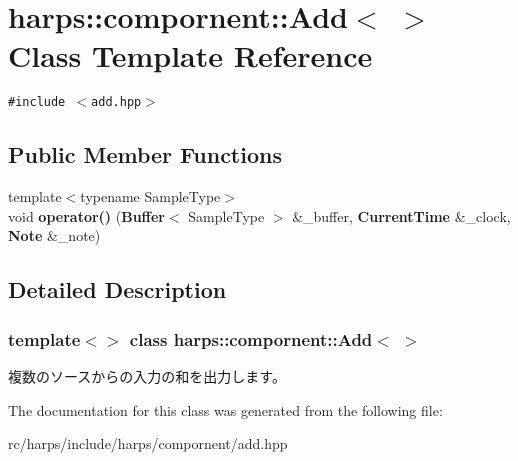 \section{harps::compornent::Add$<$ $>$ Class Template Reference}
\label{classharps_1_1compornent_1_1Add_3_01_01_4}
{\tt \#include $<$add.hpp$>$}

\subsection*{Public Member Functions}
\begin{CompactItemize}
\item 
{\footnotesize template$<$typename SampleType$>$ }\\void \textbf{operator()} ({\bf Buffer}$<$ SampleType $>$ \&\_\-buffer, {\bf CurrentTime} \&\_\-clock, {\bf Note} \&\_\-note)\label{classharps_1_1compornent_1_1Add_3_01_01_4_567dd3eabdc98493836079278d6065f9}

\end{CompactItemize}


\subsection{Detailed Description}
\subsubsection*{template$<$$>$ class harps::compornent::Add$<$  $>$}

複数のソースからの入力の和を出力します。 

The documentation for this class was generated from the following file:\begin{CompactItemize}
\item 
rc/harps/include/harps/compornent/add.hpp\end{CompactItemize}
